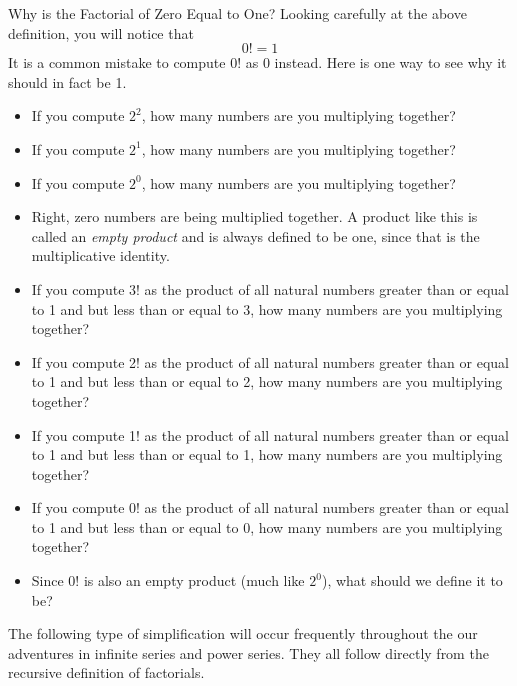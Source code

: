 \begin{exercise}{Why is the Factorial of Zero Equal to One? \Coffeecup}
Looking carefully at the above definition, you will notice that $$ 0!=1$$
It is a common mistake to compute 0! as 0 instead.  Here is one way to see why it should in fact be 1.

\begin{itemize}
\item If you compute $2^2$, how many numbers are you multiplying together? 

\item If you compute $2^1$, how many numbers are you multiplying together? 

\item If you compute $2^0$, how many numbers are you multiplying together?

\item Right, zero numbers are being multiplied together.  A product like this is called an \emph{empty product} and is always defined to be one, since that is the multiplicative identity.

\item If you compute 3! as the product of all natural numbers greater than or equal to 1 and but less than or equal to 3, how many numbers are you multiplying together?  

\item If you compute 2! as the product of all natural numbers greater than or equal to 1 and but less than or equal to 2, how many numbers are you multiplying together?  


\item If you compute 1! as the product of all natural numbers greater than or equal to 1 and but less than or equal to 1, how many numbers are you multiplying together?  


\item If you compute 0! as the product of all natural numbers greater than or equal to 1 and but less than or equal to 0, how many numbers are you multiplying together?  

\item Since 0! is also an empty product (much like $2^0$), what should we define it to be?
\end{itemize}
\end{exercise}
The following type of simplification will occur frequently throughout the our adventures in infinite series and power series.  They all follow directly from the recursive definition of factorials.
